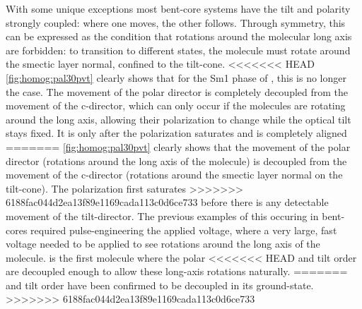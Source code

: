 \documentclass[aagreenthesis]{subfiles}
\begin{document}
With some unique exceptions\cite{michi}
most bent-core systems have the tilt and
polarity strongly coupled: where one moves, the other follows. Through symmetry,
this can be expressed as the condition that rotations around the molecular long
axis are forbidden: to transition to different states, the molecule must rotate
around the smectic layer normal, confined to the tilt-cone.
<<<<<<< HEAD
\autoref{fig:homog:pal30pvt} clearly shows that for the Sm1 phase of
\nfour{}, this is no longer the case. The movement of the polar
director is completely decoupled from the
movement of the c-director, which can only occur if the \nfour{} molecules
are rotating around the long axis, allowing their polarization to change while
the optical tilt stays fixed. It is only
after the polarization saturates and is completely aligned
=======
\autoref{fig:homog:pal30pvt} clearly shows that the movement of the polar
director (rotations around the long axis of the molecule) is decoupled from the
movement of the c-director (rotations around the smectic layer normal on the
tilt-cone). The polarization first saturates
>>>>>>> 6188fac044d2ea13f89e1169cada113c0d6ce733
before there is any detectable movement of the tilt-director. The previous
examples of this occuring in bent-cores required pulse-engineering the applied
voltage,
where a very large, fast voltage needed to be applied to see rotations around
the long axis of the molecule. \nfour{} is the first molecule where the polar
<<<<<<< HEAD
and tilt order are decoupled enough to allow these long-axis rotations
naturally.
=======
and tilt order have been confirmed to be decoupled in its ground-state.
>>>>>>> 6188fac044d2ea13f89e1169cada113c0d6ce733
\end{document}
